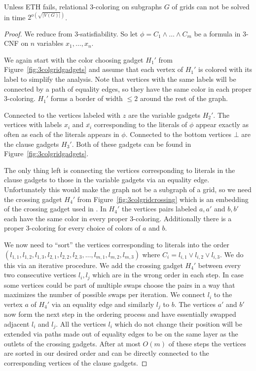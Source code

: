 \begin{lemma}
    \label{lem:3colgrid}
    Unless ETH fails, relational $3$-coloring on subgraphs $G$ of grids can not be solved in time $2^{o\left(\sqrt{|V(G)|}\right)}$.
\end{lemma}
\begin{proof}
    We reduce from $3$-satisfiability.
    So let $\phi = C_1 \land \ldots \land C_m$ be a formula in $3$-CNF on $n$ variables $x_1, \ldots, x_n$.

    We again start with the color choosing gadget $H_1'$ from Figure~\ref{fig:3colgridgadgets} and assume that each vertex of $H_1'$ is colored with its label to simplify the analysis.
    Note that vertices with the same labels will be connected by a path of equality edges, so they have the same color in each proper $3$-coloring.
    $H_1'$ forms a border of width $\leq 2$ around the rest of the graph.

    Connected to the vertices labeled with $z$ are the variable gadgets $H_2'$.
    The vertices with labels $x_i$ and $\overline{x_i}$ corresponding to the literals of $\phi$ appear exactly as often as each of the literals appears in $\phi$.
    Connected to the bottom vertices $\bot$ are the clause gadgets $H_3'$.
    Both of these gadgets can be found in Figure~\ref{fig:3colgridgadgets}.

    The only thing left is connecting the vertices corresponding to literals in the clause gadgets to those in the variable gadgets via an equality edge.
    Unfortunately this would make the graph not be a subgraph of a grid, so we need the crossing gadget $H_4'$ from Figure~\ref{fig:3colgridcrossing} which is an embedding of the crossing gadget used in \cite{DBLP:journals/tcs/GareyJS76}.
    In $H_4'$ the vertices pairs labeled $a, a'$ and $b, b'$ each have the same color in every proper $3$-coloring.
    Additionally there is a proper $3$-coloring for every choice of colors of $a$ and $b$.

    We now need to ``sort'' the vertices corresponding to literals into the order $(l_{1,1}, l_{1,2}, l_{1,3}, l_{2,1}, l_{2,2}, l_{2,3}, \ldots, l_{m,1}, l_{m,2}, l_{m,3})$ where $C_i = l_{i, 1} \lor l_{i, 2} \lor l_{i, 3}$.
    We do this via an iterative procedure.
    We add the crossing gadget $H_4'$ between every two consecutive vertices $l_i, l_j$ which are in the wrong order in each step.
    In case some vertices could be part of multiple swaps choose the pairs in a way that maximizes the number of possible swaps per iteration.
    We connect $l_i$ to the vertex $a$ of $H_4'$ via an equality edge and similarly $l_j$ to $b$.
    The vertices $a'$ and $b'$ now form the next step in the ordering process and have essentially swapped adjacent $l_i$ and $l_j$.
    All the vertices $l_i$ which do not change their position will be extended via paths made out of equality edges to be on the same layer as the outlets of the crossing gadgets.
    After at most $O(m)$ of these steps the vertices are sorted in our desired order and can be directly connected to the corresponding vertices of the clause gadgets.


\end{proof}
